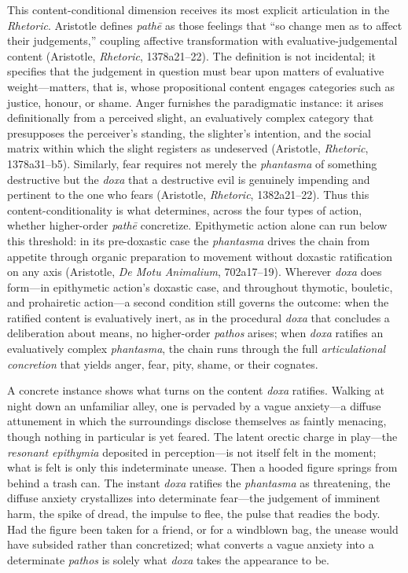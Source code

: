 \documentclass{article}
\begin{document}
This content-conditional dimension receives its most explicit articulation in the \textit{Rhetoric}. Aristotle defines \textit{pathē} as those feelings that ``so change men as to affect their judgements,'' coupling affective transformation with evaluative-judgemental content (Aristotle, \textit{Rhetoric}, 1378a21--22). The definition is not incidental; it specifies that the judgement in question must bear upon matters of evaluative weight---matters, that is, whose propositional content engages categories such as justice, honour, or shame. Anger furnishes the paradigmatic instance: it arises definitionally from a perceived slight, an evaluatively complex category that presupposes the perceiver's standing, the slighter's intention, and the social matrix within which the slight registers as undeserved (Aristotle, \textit{Rhetoric}, 1378a31--b5). Similarly, fear requires not merely the \textit{phantasma} of something destructive but the \textit{doxa} that a destructive evil is genuinely impending and pertinent to the one who fears (Aristotle, \textit{Rhetoric}, 1382a21--22). Thus this content-conditionality is what determines, across the four types of action, whether higher-order \textit{pathē} concretize. Epithymetic action alone can run below this threshold: in its pre-doxastic case the \textit{phantasma} drives the chain from appetite through organic preparation to movement without doxastic ratification on any axis (Aristotle, \textit{De Motu Animalium}, 702a17--19). Wherever \textit{doxa} does form---in epithymetic action's doxastic case, and throughout thymotic, bouletic, and prohairetic action---a second condition still governs the outcome: when the ratified content is evaluatively inert, as in the procedural \textit{doxa} that concludes a deliberation about means, no higher-order \textit{pathos} arises; when \textit{doxa} ratifies an evaluatively complex \textit{phantasma}, the chain runs through the full \textit{articulational concretion} that yields anger, fear, pity, shame, or their cognates.

A concrete instance shows what turns on the content \textit{doxa} ratifies. Walking at night down an unfamiliar alley, one is pervaded by a vague anxiety---a diffuse attunement in which the surroundings disclose themselves as faintly menacing, though nothing in particular is yet feared. The latent orectic charge in play---the \textit{resonant epithymia} deposited in perception---is not itself felt in the moment; what is felt is only this indeterminate unease. Then a hooded figure springs from behind a trash can. The instant \textit{doxa} ratifies the \textit{phantasma} as threatening, the diffuse anxiety crystallizes into determinate fear---the judgement of imminent harm, the spike of dread, the impulse to flee, the pulse that readies the body. Had the figure been taken for a friend, or for a windblown bag, the unease would have subsided rather than concretized; what converts a vague anxiety into a determinate \textit{pathos} is solely what \textit{doxa} takes the appearance to be.
\end{document}
